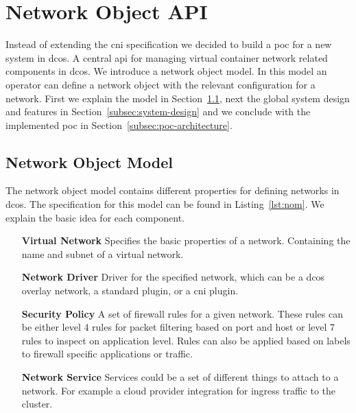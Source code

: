 \section{Network Object API}
\label{sec:networkobject-api}
Instead of extending the \gls{cni} specification we decided to build a \gls{poc} for a new system in \gls{dcos}. A central \gls{api} for managing virtual container network related components in \gls{dcos}. We introduce a network object model. In this model an operator can define a network object with the relevant configuration for a network. First we explain the model in Section~\ref{subsec:network-object-model}, next the global system design and features in Section~\ref{subsec:system-design} and we conclude with the implemented \gls{poc} in Section~\ref{subsec:poc-architecture}.

\subsection{Network Object Model}
\label{subsec:network-object-model}
The network object model contains different properties for defining networks in \gls{dcos}. The specification for this model can be found in Listing~\ref{lst:nom}. We explain the basic idea for each component.



\begin{itemize}
    \item[\textbf{Virtual Network}] Specifies the basic properties of a network. Containing the name and subnet of a virtual network.
    \item[\textbf{Network Driver}] Driver for the specified network, which can be  a \gls{dcos} overlay network, a standard plugin, or a \gls{cni} plugin.
    \item[\textbf{Security Policy}] A set of firewall rules for a given network. These rules can be either level 4 rules for packet filtering based on port and host or level 7 rules to inspect on application level. Rules can also be applied based on labels to firewall specific applications or traffic.
    \item[\textbf{Network Service}] Services could be a set of different things to attach to a network. For example a cloud provider integration for ingress traffic to the cluster.
\end{itemize}

